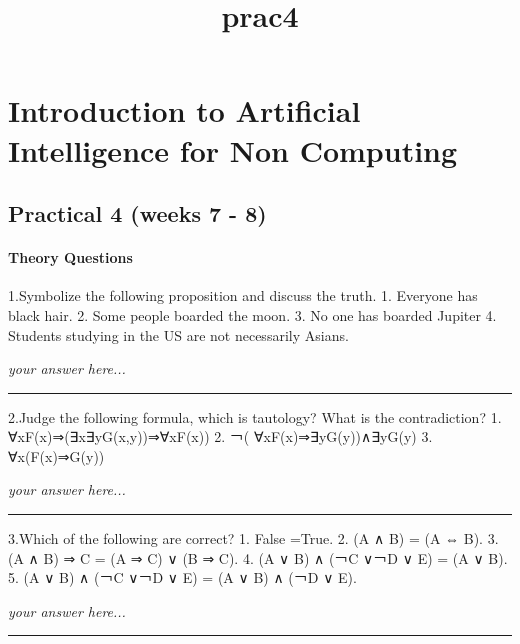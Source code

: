 \documentclass[11pt]{article}
\title{prac4}
\begin{document}
    
    
    \maketitle
    
    

    
    \section{Introduction to Artificial Intelligence for Non
Computing}\label{introduction-to-artificial-intelligence-for-non-computing}

    \subsection{Practical 4 (weeks 7 - 8)}\label{practical-4-weeks-7---8}

    \paragraph{Theory Questions}\label{theory-questions}

    1.Symbolize the following proposition and discuss the truth. 1. Everyone
has black hair. 2. Some people boarded the moon. 3. No one has boarded
Jupiter 4. Students studying in the US are not necessarily Asians.

    \emph{your answer here...}

\begin{center}\rule{0.5\linewidth}{\linethickness}\end{center}

    2.Judge the following formula, which is tautology? What is the
contradiction? 1. ∀xF(x)⇒(∃x∃yG(x,y))⇒∀xF(x)) 2. ￢(
∀xF(x)⇒∃yG(y))∧∃yG(y) 3. ∀x(F(x)⇒G(y))

    \emph{your answer here...}

\begin{center}\rule{0.5\linewidth}{\linethickness}\end{center}

    3.Which of the following are correct? 1. False \textbar{}=True. 2. (A ∧
B) \textbar{}= (A ⇔ B). 3. (A ∧ B) ⇒ C \textbar{}= (A ⇒ C) ∨ (B ⇒ C). 4.
(A ∨ B) ∧ (￢C ∨￢D ∨ E) \textbar{}= (A ∨ B). 5. (A ∨ B) ∧ (￢C ∨￢D ∨ E)
\textbar{}= (A ∨ B) ∧ (￢D ∨ E).

    \emph{your answer here...}

\begin{center}\rule{0.5\linewidth}{\linethickness}\end{center}
\end{document}
